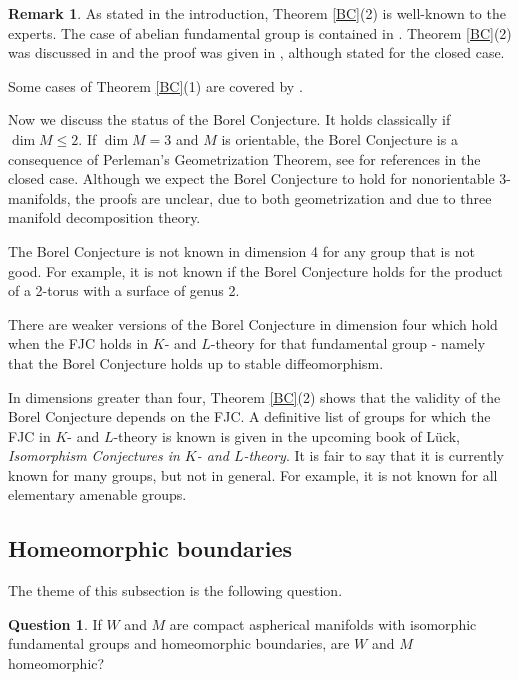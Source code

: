 \documentclass[12pt]{amsart}
\theoremstyle{definition}
\newtheorem{remark}[theorem]{Remark}
\newtheorem*{question}{Question}
\begin{document}
\begin{remark}
As stated in the introduction, Theorem \ref{BC}(2) is well-known to the experts.   The case of abelian fundamental group is contained in \cite[Essay V, Appendix C]{KS}.   Theorem \ref{BC}(2) was discussed in \cite{FRR} and the proof was given in \cite{L}, although stated for the closed case.

Some cases of Theorem \ref{BC}(1) are covered by \cite[Theorem on page 205]{FQ}.
 


Now we discuss the status of the Borel Conjecture.   It holds classically if $\dim M \leq 2$.   If $\dim M = 3$ and $M$ is orientable, the Borel Conjecture is a consequence of Perleman's Geometrization Theorem,  see \cite[Theorem 0.7]{KL} for references in the closed case.   Although we expect the Borel Conjecture to hold for nonorientable 3-manifolds, the proofs are unclear, due to both geometrization and due to three manifold decomposition theory.

The Borel Conjecture is not known in dimension 4 for any group that is not good.
 For example, it is not known if the Borel Conjecture holds for the product of a 2-torus with a surface of genus 2.   
 
 There are weaker versions of the Borel Conjecture in dimension four which hold when the FJC holds in $K$- and $L$-theory for that fundamental group - namely that the Borel Conjecture holds up to stable diffeomorphism.
 
In dimensions greater than four, Theorem \ref{BC}(2) shows that the validity of the Borel Conjecture depends on the FJC.  
A definitive list of groups for which the FJC in $K$- and $L$-theory is known is given in the upcoming book of L\"uck, {\em Isomorphism Conjectures in $K$- and $L$-theory}.   It is fair to say that it is currently known for many groups, but not in general.   For example, it is not known for all elementary amenable groups.   




 \end{remark}
 

\subsection{Homeomorphic boundaries} \label{subsection_hb}

The theme of this subsection is the following question.

\begin{question}
If $W$ and $M$ are compact aspherical manifolds with isomorphic fundamental groups and homeomorphic boundaries, are $W$ and $M$ homeomorphic?
\end{question}
\end{document}
